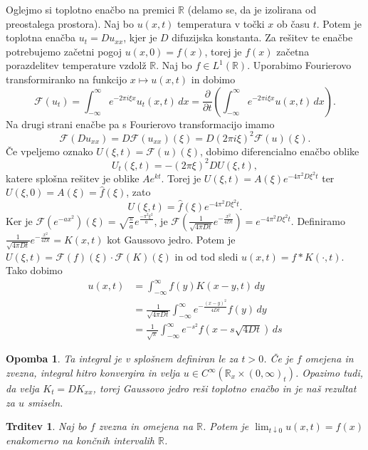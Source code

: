 \documentclass[10pt, a4paper]{article}
\newtheorem{trditev}[izr]{Trditev}
\newtheorem*{opomba}{Opomba}
\newcommand{\R}{\mathbb {R}}
\newcommand{\F}{\mathcal{F}}
\begin{document}
Oglejmo si toplotno enačbo na premici $\R$ (delamo se, da je izolirana od preostalega prostora).
Naj bo $u(x, t)$ temperatura v točki $x$ ob času $t$.
Potem je toplotna enačba $u_t = D u_{xx}$, kjer je $D$ difuzijska konstanta.
Za rešitev te enačbe potrebujemo začetni pogoj $u(x, 0) = f(x)$,
torej je $f(x)$ začetna porazdelitev temperature vzdolž $\R$.
Naj bo $f \in L^1 (\R)$. Uporabimo Fourierovo transformiranko na funkcijo $x \mapsto u(x, t)$
in dobimo 
$$\F (u_t) = \int_{-\infty} ^\infty e^{-2\pi i \xi x} u_t (x, t)\, dx = \frac{\partial}{\partial t} \left(\int_{-\infty} ^\infty e^{-2\pi i \xi x} u (x, t)\, dx\right).$$
Na drugi strani enačbe pa s Fourierovo transformacijo imamo
$$\F (D u_{xx}) = D \F (u_{xx}) (\xi) = D (2 \pi i \xi)^2 \F (u) (\xi).$$
Če vpeljemo oznako $U(\xi, t) = \F (u) (\xi)$, dobimo diferencialno enačbo oblike
$$U_t (\xi, t) = - (2 \pi \xi)^2 D U(\xi, t),$$
katere splošna rešitev je oblike $A e^{kt}$.
Torej je $U(\xi, t) = A(\xi) e^{-4 \pi^2 D \xi^2 t}$
ter $U(\xi, 0) = A(\xi) = \hat{f} (\xi)$, zato  
$$U(\xi, t) = \hat{f} (\xi) e^{-4 \pi^2 D \xi^2 t}.$$
Ker je $\F (e^{-a x^2}) (\xi) = \sqrt{\frac{\pi}{a}} e^\frac{-\pi^2 \xi^2}{a}$,
je $\F \left(\frac{1}{\sqrt{4 \pi D t}} e^{-\frac{x^2}{4 D t}}\right) = e^{-4 \pi^2 D \xi^2 t}$.
Definiramo $\frac{1}{\sqrt{4 \pi D t}} e^{-\frac{x^2}{4 D t}} = K(x, t)$ kot Gaussovo jedro.
Potem je $U(\xi, t) =\F (f) (\xi)\cdot \F (K) (\xi)$ in od tod sledi $u(x, t) = f * K(\cdot, t)$.
Tako dobimo
\begin{align*}
    u(x, t) &= \int_{-\infty} ^\infty f(y) K(x - y, t)\, dy\\
    &= \frac{1}{\sqrt{4 \pi D t}} \int_{-\infty} ^\infty e^{-\frac{(x - y)^2}{4 Dt}} f(y)\, dy\\
    &= \frac{1}{\sqrt{\pi}} \int_{-\infty} ^\infty e^{-s^2} f(x - s\sqrt{4Dt})\, ds
\end{align*}

\begin{opomba}
    Ta integral je v splošnem definiran le za $t > 0$.
    Če je $f$ omejena in zvezna, integral hitro konvergira in velja $u \in C^\infty (\R_x \times (0, \infty)_t)$.
    Opazimo tudi, da velja $K_t = D K_{xx}$, torej Gaussovo jedro reši toplotno enačbo 
    in je naš rezultat za $u$ smiseln.
\end{opomba}

\begin{trditev}
    Naj bo $f$ zvezna in omejena na $\R$.
    Potem je $\lim_{t \downarrow 0} u(x, t) = f(x)$ enakomerno na končnih intervalih $\R$.
\end{trditev}
\end{document}

